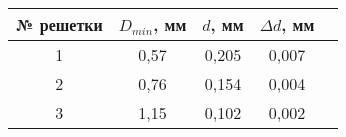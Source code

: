 \begin{tabular}{|c|c|c|c|c|}
\hline
№ решетки&$D_{min}$, мм&$d$, мм&$\Delta d$, мм\\
\hline
1&0,57&0,205&0,007\\
\hline
2&0,76&0,154&0,004\\
\hline
3&1,15&0,102&0,002\\
\hline
\end{tabular}